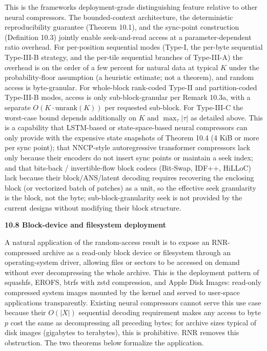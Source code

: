 \documentclass[
]{article}
\begin{document}
This is the framework\textquotesingle s deployment-grade distinguishing
feature relative to other neural compressors. The bounded-context
architecture, the deterministic reproducibility guarantee (Theorem
10.1), and the sync-point construction (Definition 10.3) jointly
enable seek-and-read access at a parameter-dependent ratio
overhead. For per-position sequential modes (Type-I, the per-byte
sequential Type-III-B strategy, and the per-tile sequential
branches of Type-III-A) the overhead is on the order of a few
percent for natural data at typical $K$ under the
probability-floor assumption (a heuristic estimate; not a theorem),
and random access is byte-granular. For whole-block rank-coded
Type-II and partition-coded Type-III-B modes, access is only
sub-block-granular per Remark 10.3a, with a separate $O(K \cdot
\mathrm{unrank}(K))$ per requested sub-block. For Type-III-C the
worst-case bound depends additionally on $K$ and $\max_\tau
|\tau|$ as detailed above. This is a capability that
LSTM-based or state-space-based
neural compressors can only provide with the expensive state
snapshots of Theorem 10.4 (4 KiB or more per sync point); that
NNCP-style autoregressive transformer compressors lack only because
their encoders do not insert sync points or maintain a seek index;
and that bits-back / invertible-flow block codecs (Bit-Swap, IDF++,
HiLLoC) lack because their block/ANS/latent decoding requires
recovering the enclosing block (or vectorized batch of patches) as
a unit, so the effective seek granularity is the block, not the
byte; sub-block-granularity seek is not provided by the current
designs without modifying their block structure.

\textbf{10.8 Block-device and filesystem deployment}

A natural application of the random-access result is to expose an
RNR-compressed archive as a read-only block device or filesystem through
an operating-system driver, allowing files or sectors to be accessed on
demand without ever decompressing the whole archive. This is the
deployment pattern of squashfs, EROFS, btrfs with zstd compression, and
Apple Disk Images: read-only compressed system images mounted by the
kernel and served to user-space applications transparently. Existing
neural compressors cannot serve this use case because their
$O(|X|)$ sequential decoding requirement makes any access to byte
$p$ cost the same as decompressing all preceding bytes; for archive
sizes typical of disk images (gigabytes to terabytes), this is
prohibitive. RNR removes this obstruction. The two theorems below
formalize the application.
\end{document}
